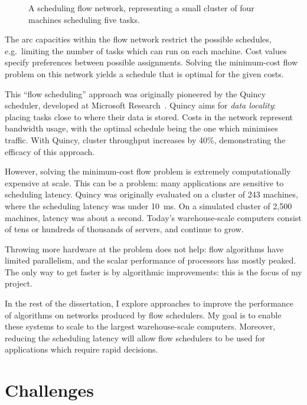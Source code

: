 \begin{figure}
    \centering
     
    \caption[A scheduling flow network]{A scheduling flow network, representing a small cluster of four machines scheduling five tasks.}
\end{figure}


The arc capacities within the flow network restrict the possible schedules, e.g.\ limiting the number of tasks which can run on each machine. Cost values specify preferences between possible assignments. Solving the minimum-cost flow problem on this network yields a schedule that is optimal for the given costs.

This ``flow scheduling'' approach was originally pioneered by the Quincy scheduler, developed at Microsoft Research~\cite{Isard:2009}. Quincy aims for \emph{data locality}: placing tasks close to where their data is stored. Costs in the network represent bandwidth usage, with the optimal schedule being the one which minimises traffic. With Quincy, cluster throughput increases by 40\%, demonstrating the efficacy of this approach.

However, solving the minimum-cost flow problem is extremely computationally expensive at scale. This can be a problem: many applications are sensitive to scheduling latency. Quincy was originally evaluated on a cluster of 243 machines, where the scheduling latency was under \SI{10}{\milli\second}. On a simulated cluster of 2,500 machines, latency was about a second. Today's warehouse-scale computers consist of tens or hundreds of thousands of servers, and continue to grow.

Throwing more hardware at the problem does not help: flow algorithms have limited parallelism, and the scalar performance of processors has mostly peaked. The only way to get faster is by algorithmic improvements: this is the focus of my project.

In the rest of the dissertation, I explore approaches to improve the performance of algorithms on networks produced by flow schedulers. My goal is to enable these systems to scale to the largest warehouse-scale computers. Moreover, reducing the scheduling latency will allow flow schedulers to be used for applications which require rapid decisions.

\section{Challenges} \label{sec:intro-challenges}

